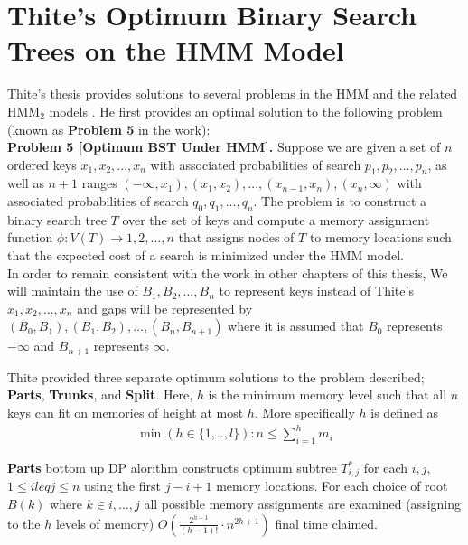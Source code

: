 \documentclass[letterpaper,12pt,titlepage,oneside,final]{book}
\theoremstyle{plain}
\begin{document}
\section{Thite's Optimum Binary Search Trees on the HMM Model}

Thite's thesis provides solutions to several problems in the HMM and the related HMM$_2$ models \cite{thite2008optimum}. He first provides an optimal solution to the following problem (known as \textbf{Problem 5} in the work):\\


\noindent \textbf{Problem 5 [Optimum BST Under HMM].}  \cite{thite2008optimum} Suppose we are given a set of $n$ ordered keys $x_1, x_2, ..., x_n$ with associated probabilities of search $p_1, p_2, ..., p_n$, as well as $n+1$ ranges $(- \infty, x_1), (x_1, x_2), ..., (x_{n-1}, x_n), (x_n, \infty)$ with associated probabilities of search $q_0, q_1, ..., q_n$. The problem is to construct a binary search tree $T$ over the set of keys and compute a memory assignment function $\phi : V (T) \rightarrow {1, 2, ..., n}$ that assigns nodes of $T$ to memory locations such that the expected cost of a search is minimized under the HMM model. \\

In order to remain consistent with the work in other chapters of this thesis, We will maintain the use of $B_1, B_2, ..., B_n$ to represent keys instead of Thite's $x_1, x_2, ..., x_n$ and gaps will be represented by $(B_0, B_1), (B_1, B_2), ..., (B_n, B_{n+1})$ where it is assumed that $B_0$ represents $- \infty$ and $B_{n+1}$ represents $\infty$.

Thite provided three separate optimum solutions to the problem described; \textbf{Parts}, \textbf{Trunks}, and \textbf{Split}. Here, $h$ is the minimum memory level such that all $n$ keys can fit on memories of height at most $h$. More specifically $h$ is defined as \\
\begin{align*}
\min(h \in \{1,..,l\} ): n \leq \sum_{i = 1}^{h}m_i
\end{align*}

\textbf{Parts}
bottom up DP alorithm
constructs optimum subtree $T^{*}_{i,j}$ for each $i,j$, $1 \leq i leq j \leq n$ using the first $j-i+1$ memory locations.
For each choice of root $B(k)$ where $k \in {i, ..., j}$ all possible memory assignments are examined (assigning to the $h$ levels of memory)
$O(\frac{2^{h-1}}{(h-1)!}\cdot n^{2h+1})$ final time claimed.
\end{document}
